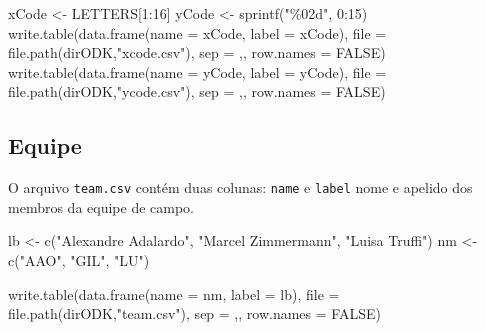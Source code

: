 \documentclass[
  letterpaper,
]{report}
\newenvironment{Shaded}{\begin{snugshade}}{\end{snugshade}}
\newcommand{\AttributeTok}[1]{\textcolor[rgb]{0.40,0.45,0.13}{#1}}
\newcommand{\ConstantTok}[1]{\textcolor[rgb]{0.56,0.35,0.01}{#1}}
\newcommand{\DecValTok}[1]{\textcolor[rgb]{0.68,0.00,0.00}{#1}}
\newcommand{\FunctionTok}[1]{\textcolor[rgb]{0.28,0.35,0.67}{#1}}
\newcommand{\NormalTok}[1]{\textcolor[rgb]{0.00,0.23,0.31}{#1}}
\newcommand{\OtherTok}[1]{\textcolor[rgb]{0.00,0.23,0.31}{#1}}
\newcommand{\SpecialCharTok}[1]{\textcolor[rgb]{0.37,0.37,0.37}{#1}}
\newcommand{\StringTok}[1]{\textcolor[rgb]{0.13,0.47,0.30}{#1}}
\begin{document}
\begin{Shaded}
\begin{Highlighting}[]
\NormalTok{xCode }\OtherTok{\textless{}{-}}\NormalTok{  LETTERS[}\DecValTok{1}\SpecialCharTok{:}\DecValTok{16}\NormalTok{]}
\NormalTok{yCode }\OtherTok{\textless{}{-}} \FunctionTok{sprintf}\NormalTok{(}\StringTok{"\%02d"}\NormalTok{, }\DecValTok{0}\SpecialCharTok{:}\DecValTok{15}\NormalTok{)}
\FunctionTok{write.table}\NormalTok{(}\FunctionTok{data.frame}\NormalTok{(}\AttributeTok{name =}\NormalTok{ xCode, }\AttributeTok{label =}\NormalTok{ xCode), }\AttributeTok{file =} \FunctionTok{file.path}\NormalTok{(dirODK,}\StringTok{"xcode.csv"}\NormalTok{),  }\AttributeTok{sep =} \StringTok{\textquotesingle{},\textquotesingle{}}\NormalTok{, }\AttributeTok{row.names =} \ConstantTok{FALSE}\NormalTok{)}
\FunctionTok{write.table}\NormalTok{(}\FunctionTok{data.frame}\NormalTok{(}\AttributeTok{name =}\NormalTok{ yCode, }\AttributeTok{label =}\NormalTok{ yCode), }\AttributeTok{file =} \FunctionTok{file.path}\NormalTok{(dirODK,}\StringTok{"ycode.csv"}\NormalTok{),  }\AttributeTok{sep =} \StringTok{\textquotesingle{},\textquotesingle{}}\NormalTok{, }\AttributeTok{row.names =} \ConstantTok{FALSE}\NormalTok{)}
\end{Highlighting}
\end{Shaded}

\subsection{Equipe}\label{equipe}

O arquivo \texttt{team.csv} contém duas colunas: \texttt{name} e
\texttt{label} nome e apelido dos membros da equipe de campo.

\begin{Shaded}
\begin{Highlighting}[]
\NormalTok{lb }\OtherTok{\textless{}{-}} \FunctionTok{c}\NormalTok{(}\StringTok{"Alexandre Adalardo"}\NormalTok{, }\StringTok{"Marcel Zimmermann"}\NormalTok{, }\StringTok{"Luisa Truffi"}\NormalTok{)}
\NormalTok{nm }\OtherTok{\textless{}{-}} \FunctionTok{c}\NormalTok{(}\StringTok{"AAO"}\NormalTok{, }\StringTok{"GIL"}\NormalTok{, }\StringTok{"LU"}\NormalTok{)}

\FunctionTok{write.table}\NormalTok{(}\FunctionTok{data.frame}\NormalTok{(}\AttributeTok{name =}\NormalTok{ nm, }\AttributeTok{label =}\NormalTok{ lb), }\AttributeTok{file =} \FunctionTok{file.path}\NormalTok{(dirODK,}\StringTok{"team.csv"}\NormalTok{),  }\AttributeTok{sep =} \StringTok{\textquotesingle{},\textquotesingle{}}\NormalTok{, }\AttributeTok{row.names =} \ConstantTok{FALSE}\NormalTok{)}
\end{Highlighting}
\end{Shaded}
\end{document}
